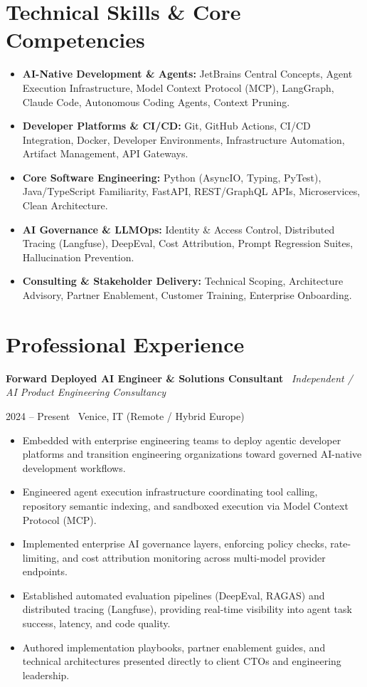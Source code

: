 \documentclass[a4paper,10pt]{article}
\newcommand{\role}[4]{%
  \vspace{2pt}\noindent
  \begin{minipage}[t]{0.70\textwidth}\raggedright\textbf{#1} \textbullet\ \textit{#3}\end{minipage}%
  \hfill
  \begin{minipage}[t]{0.28\textwidth}\raggedleft\footnotesize\color{gray}#2 \textbullet\ #4\end{minipage}%
  \vspace{1pt}%
}
\begin{document}
\section{Technical Skills \& Core Competencies}
\begin{itemize}[leftmargin=1.2em, itemsep=2pt]
  \item \textbf{AI-Native Development \& Agents:} JetBrains Central Concepts, Agent Execution Infrastructure, Model Context Protocol (MCP), LangGraph, Claude Code, Autonomous Coding Agents, Context Pruning.
  \item \textbf{Developer Platforms \& CI/CD:} Git, GitHub Actions, CI/CD Integration, Docker, Developer Environments, Infrastructure Automation, Artifact Management, API Gateways.
  \item \textbf{Core Software Engineering:} Python (AsyncIO, Typing, PyTest), Java/TypeScript Familiarity, FastAPI, REST/GraphQL APIs, Microservices, Clean Architecture.
  \item \textbf{AI Governance \& LLMOps:} Identity \& Access Control, Distributed Tracing (Langfuse), DeepEval, Cost Attribution, Prompt Regression Suites, Hallucination Prevention.
  \item \textbf{Consulting \& Stakeholder Delivery:} Technical Scoping, Architecture Advisory, Partner Enablement, Customer Training, Enterprise Onboarding.
\end{itemize}

\section{Professional Experience}

\role{Forward Deployed AI Engineer \& Solutions Consultant}{2024 -- Present}{Independent / AI Product Engineering Consultancy}{Venice, IT (Remote / Hybrid Europe)}
\begin{itemize}
  \item Embedded with enterprise engineering teams to deploy agentic developer platforms and transition engineering organizations toward governed AI-native development workflows.
  \item Engineered agent execution infrastructure coordinating tool calling, repository semantic indexing, and sandboxed execution via Model Context Protocol (MCP).
  \item Implemented enterprise AI governance layers, enforcing policy checks, rate-limiting, and cost attribution monitoring across multi-model provider endpoints.
  \item Established automated evaluation pipelines (DeepEval, RAGAS) and distributed tracing (Langfuse), providing real-time visibility into agent task success, latency, and code quality.
  \item Authored implementation playbooks, partner enablement guides, and technical architectures presented directly to client CTOs and engineering leadership.
\end{itemize}
\end{document}
